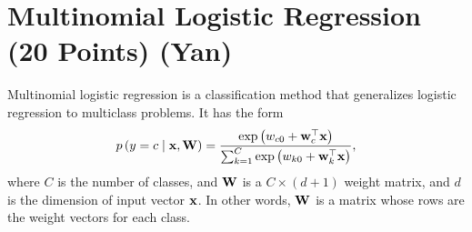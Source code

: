 \section{Multinomial Logistic Regression (20 Points) (Yan)}

Multinomial logistic regression is a classification method that generalizes logistic regression to multiclass problems. It has the form
\begin{align}
p\left( y = c \mid \mathbf{x}, \mathbf{W} \right) = \frac{\exp\left( w_{c0} + \mathbf{w}_c^\top \mathbf{x} \right) }{\sum_{k=1}^{C} \exp\left( w_{k0} + \mathbf{w}_k^\top \mathbf{x} \right)},
\end{align}
where $C$ is the number of classes, and $\mathbf{W}$ is a $C \times (d+1)$ weight matrix, and $d$ is the dimension of input vector $\mathbf{x}$. In other words, $\mathbf{W}$ is a matrix whose rows are the weight vectors for each class.

